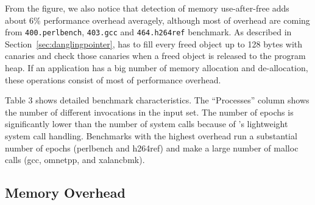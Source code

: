 From the figure, we also notice that detection of memory use-after-free adds about 6\% performance overhead averagely, although most of overhead are coming from \texttt{400.perlbench}, \texttt{403.gcc} and \texttt{464.h264ref} benchmark. As described in Section~\ref{sec:danglingpointer}, \doubletake{} has to fill every freed object up to 128 bytes with canaries and check those canaries when a freed object is released to the program heap. If an application has a big number of memory allocation and de-allocation, these operations consist of most of performance overhead. 




Table 3 shows detailed benchmark characteristics. The “Processes” column shows the number of different invocations in the input set. The number of epochs is significantly lower than the number of system calls because of \doubletake{}'s lightweight system call handling. Benchmarks with the highest overhead run a substantial number of epochs (perlbench and h264ref) and make a large number of malloc calls (gcc, omnetpp, and
xalancbmk).



\subsection{Memory Overhead}
\label{sec:memoverhead}

